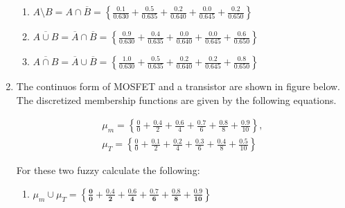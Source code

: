 \documentclass{article}
\begin{document}
\begin{enumerate}
\begin{enumerate}
          \item $A \setminus B = A \cap \overline{B}
                  = \boldsymbol{\left\{
                    \frac{0.1}{0.630} +
                    \frac{0.5}{0.635} +
                    \frac{0.2}{0.640} +
                    \frac{0.0}{0.645} +
                    \frac{0.2}{0.650}
                    \right\}}$
                \vspace{8pt}

          \item $\overline{A \cup B} = \overline{A} \cap \overline{B}
                  = \boldsymbol{\left\{
                    \frac{0.9}{0.630} +
                    \frac{0.4}{0.635} +
                    \frac{0.0}{0.640} +
                    \frac{0.0}{0.645} +
                    \frac{0.6}{0.650}
                    \right\}}$
                \vspace{8pt}

          \item $\overline{A \cap B} = \overline{A} \cup \overline{B}
                  = \boldsymbol{\left\{
                    \frac{1.0}{0.630} +
                    \frac{0.5}{0.635} +
                    \frac{0.2}{0.640} +
                    \frac{0.2}{0.645} +
                    \frac{0.8}{0.650}
                    \right\}}$
                \vspace{8pt}
        \end{enumerate}

  \item The continuos form of MOSFET and a transistor are shown in figure below. The discretized membership functions are given by the following equations.

        \begin{gather*}
          \mu_m = \left\{
          \frac{0}{0} +
          \frac{0.4}{2} +
          \frac{0.6}{4} +
          \frac{0.7}{6} +
          \frac{0.8}{8} +
          \frac{0.9}{10}
          \right\}, \\[12pt]
          \mu_T = \left\{
          \frac{0}{0} +
          \frac{0.1}{2} +
          \frac{0.2}{4} +
          \frac{0.3}{6} +
          \frac{0.4}{8} +
          \frac{0.5}{10}
          \right\}
        \end{gather*}

        For these two fuzzy calculate the following:

        \begin{enumerate}
          \item ${\mu}_m \cup {\mu}_T = \boldsymbol{\left\{
                    \frac{0}{0} +
                    \frac{0.4}{2} +
                    \frac{0.6}{4} +
                    \frac{0.7}{6} +
                    \frac{0.8}{8} +
                    \frac{0.9}{10}
                    \right\}}$


\end{enumerate}
\end{enumerate}
\end{document}
